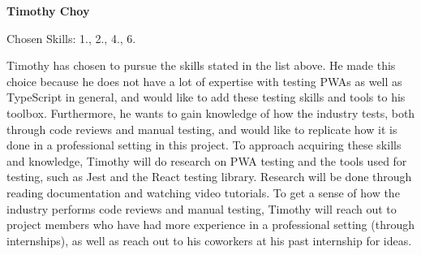 \documentclass[12pt, titlepage]{article}
\begin{document}
\begin{enumerate}
	      \textbf{Timothy Choy}

	      Chosen Skills: 1., 2., 4., 6.

	      Timothy has chosen to pursue the skills stated in the list above. He made this choice because he
	      does not have a lot of expertise with testing PWAs as well as TypeScript in general, and would like
	      to add these testing skills and tools to his toolbox. Furthermore, he wants to gain knowledge of
	      how the industry tests, both through code reviews and manual testing, and would like to replicate
	      how it is done in a professional setting in this project. To approach acquiring these skills and
	      knowledge, Timothy will do research on PWA testing and the tools used for testing, such as Jest and
	      the React testing library. Research will be done through reading documentation and watching video
	      tutorials. To get a sense of how the industry performs code reviews and manual testing, Timothy
	      will reach out to project members who have had more experience in a professional setting (through
	      internships), as well as reach out to his coworkers at his past internship for ideas.

\end{enumerate}
\end{document}
